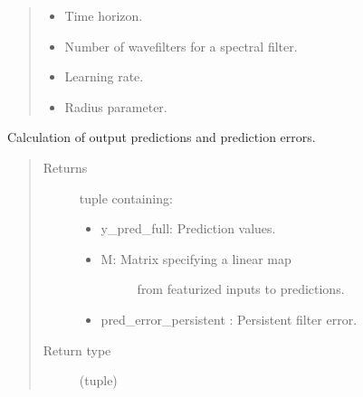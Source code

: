 \documentclass[letterpaper,10pt,english]{sphinxmanual}
\begin{document}
\begin{fulllineitems}
\begin{quote}
\begin{description}
\begin{itemize}
\item {} 
\sphinxAtStartPar
{} \textendash{} Time horizon.

\item {} 
\sphinxAtStartPar
{} \textendash{} Number of wave\sphinxhyphen{}filters for a spectral filter.

\item {} 
\sphinxAtStartPar
{} \textendash{} Learning rate.

\item {} 
\sphinxAtStartPar
{} \textendash{} Radius parameter.

\end{itemize}

\end{description}\end{quote}

\begin{fulllineitems}
\label{\detokenize{LDS.LDS.filters:LDS.LDS.filters.wave_filtering_siso_persistent.WaveFilteringSISOPersistent.predict}}
\sphinxAtStartPar
Calculation of output predictions and prediction errors.
\begin{quote}\begin{description}
\item[{Returns}] \leavevmode
\sphinxAtStartPar

\sphinxAtStartPar
tuple containing:
\begin{itemize}
\item {} 
\sphinxAtStartPar
y\_pred\_full: Prediction values.

\item {} \begin{description}
\item[{M: Matrix specifying a linear map}] \leavevmode
\sphinxAtStartPar
from featurized inputs to predictions.

\end{description}

\item {} 
\sphinxAtStartPar
pred\_error\_persistent : Persistent filter error.

\end{itemize}


\item[{Return type}] \leavevmode
\sphinxAtStartPar
(tuple)

\end{description}\end{quote}

\end{fulllineitems}


\end{fulllineitems}
\end{document}
